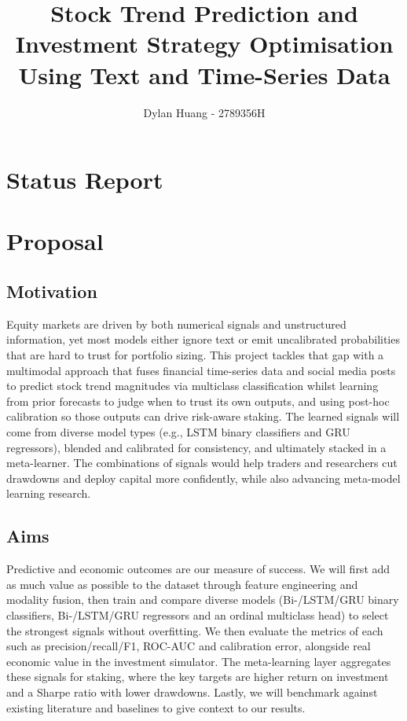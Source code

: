 \documentclass[11pt]{article}
\title{Stock Trend Prediction and Investment Strategy Optimisation Using Text and Time-Series Data}
\author{Dylan Huang - 2789356H}
\begin{document}
\maketitle
\section*{Status Report}
\section{Proposal}\label{proposal}

\subsection{Motivation}\label{motivation}
Equity markets are driven by both numerical signals and unstructured information, yet most models either ignore text or emit uncalibrated probabilities that are hard to trust for portfolio sizing. This project tackles that gap with a multimodal approach that fuses financial time-series data and social media posts to predict stock trend magnitudes via multiclass classification whilst learning from prior forecasts to judge when to trust its own outputs, and using post-hoc calibration so those outputs can drive risk-aware staking. The learned signals will come from diverse model types (e.g., LSTM binary classifiers and GRU regressors), blended and calibrated for consistency, and ultimately stacked in a meta-learner. The combinations of signals would help traders and researchers cut drawdowns and deploy capital more confidently, while also advancing meta-model learning research.

\subsection{Aims}\label{aims}
Predictive and economic outcomes are our measure of success. We will first add as much value as possible to the dataset through feature engineering and modality fusion, then train and compare diverse models (Bi-/LSTM/GRU binary classifiers, Bi-/LSTM/GRU regressors and an ordinal multiclass head) to select the strongest signals without overfitting. We then evaluate the metrics of each such as precision/recall/F1, ROC-AUC and calibration error, alongside real economic value in the investment simulator. The meta-learning layer aggregates these signals for staking, where the key targets are higher return on investment and a Sharpe ratio with lower drawdowns. Lastly, we will benchmark against existing literature and baselines to give context to our results.
\end{document}
